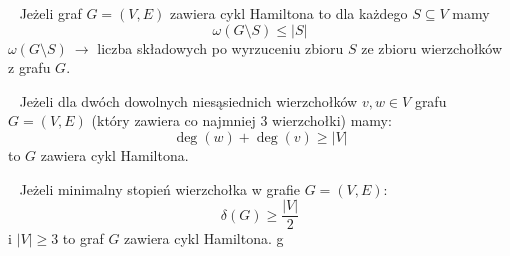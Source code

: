 \begin{theorem}~ %
Jeżeli graf $G=(V,E)$ zawiera cykl Hamiltona to dla każdego $S\subseteq V$ mamy
$$\omega (G\setminus S)\leq |S|$$
$\omega (G\setminus S)\ \rightarrow$ liczba składowych po wyrzuceniu zbioru $S$ ze zbioru wierzchołków z grafu $G$.
\end{theorem}
\begin{theorem}[Ore]\label{the:Ore}~ %
Jeżeli dla dwóch dowolnych niesąsiednich wierzchołków $v,w\in V$ grafu $G=(V,E)$ (który zawiera co najmniej $3$ wierzchołki) mamy: 
$$\deg (w) + \deg (v) \geq |V|$$
to $G$ zawiera cykl Hamiltona.
\end{theorem}
\begin{theorem}[Dirac]\label{the:Dirac}~ %
Jeżeli minimalny stopień wierzchołka w grafie $G=(V,E)$: $$\delta (G) \geq \frac{|V|}{2}$$ i $|V|\geq 3$ to graf $G$ zawiera cykl Hamiltona. 
g\end{theorem}

